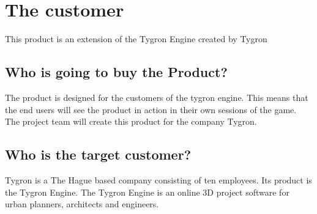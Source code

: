\section{The customer}
This product is an extension of the Tygron Engine created by Tygron\newline

\subsection{Who is going to buy the Product?}
The product is designed for the customers of the tygron engine. This means that the end users will see the product in action in their own sessions of the game. The project team will create this product for the company Tygron. \newline

\subsection{Who is the target customer?}
Tygron is a The Hague based company consisting of ten employees. Its product is the Tygron Engine. The Tygron Engine is an online 3D project software for urban planners, architects and engineers.
